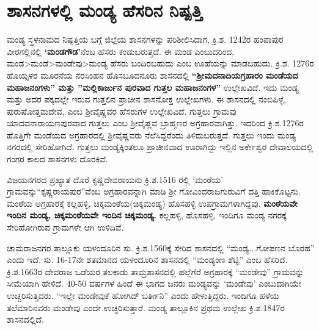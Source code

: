 \section*{ಶಾಸನಗಳಲ್ಲಿ ಮಂಡ್ಯ ಹೆಸರಿನ ನಿಷ್ಪತ್ತಿ}

ಮಂಡ್ಯ ಸ್ಥಳನಾಮದ ನಿಷ್ಪತ್ತಿಯ ಬಗ್ಗೆ ಜಿಲ್ಲೆಯ ಶಾಸನಗಳನ್ನು ಪರಿಶೀಲಿಸಿದಾಗ, ಕ್ರಿ.ಶ. 1242ರ ಹಂಪಾಪುರ ವೀರಗಲ್ಲಿನಲ್ಲಿ \textbf{‘ಮಂಡಗೌಡ’}ನೆಂಬ ಹೆಸರು ಕಂಡುಬರುತ್ತದೆ. ಈ ಮಂಡ ಎಂಬುದರಿಂದ, ಮಂಡ\textgreater ಮಂಡೆ\textgreater ಮಂಡೇವು\textgreater ಮಂಡ್ಯ ಹೆಸರು ಬಂದಿರಬಹುದು ಎಂಬ ಊಹೆಯನ್ನು ಮಾಡಬಹುದು. ಕ್ರಿ.ಶ. 1276ರ ಹೊಯ್ಸಳರ ಮೂರನೆಯ ನರಸಿಂಹನ ಹೊಸಬೂದನೂರು ಶಾಸನದಲ್ಲಿ \textbf{“ಶ‍್ರೀಮದನಾದಿಯಗ್ರಹಾರಂ ಮಂಡೆಯದ ಮಹಾಜನಂಗಳು” ಮತ್ತು ''ಮಲ್ಲಿಕಾರ್ಜುನ ಪುರವಾದ ಗುತ್ತಲ ಮಹಾಜನಂಗಳ”} ಉಲ್ಲೇಖವಿದೆ. ಇದು ಮಂಡ್ಯ ಮತ್ತು ಅದರ ಪಕ್ಕದಲ್ಲೇ ಇರುವ ಗುತ್ತಲಿನ ಪ್ರಾಚೀನ ಶಾಸನೋಕ್ತ ಉಲ್ಲೇಖಗಳು. ಈ ಶಾಸನದಲ್ಲಿ ನಂಬಿಪಿಳ್ಳೆ, ಪುರುಷೋತ್ತಮದೇವ, ಎಂಬ ಶ‍್ರೀವೈಷ್ಣವರ ಹೆಸರುಗಳ ಉಲ್ಲೇಖವಿದೆ. ಗುತ್ತಲು ಗ್ರಾಮವು ಯಾದವನಾರಾಯಣಪುರವಾದ ಗುತ್ತಲು ಎಂಬ ಶ‍್ರೀವೈಷ್ಣವ ಬ್ರಾಹ್ಮಣರ ಅಗ್ರಹಾರವಾಗಿತ್ತು. ಇದರಿಂದ ಕ್ರಿ.ಶ.1276ರ ಹೊತ್ತಿಗೇ ಮಂಡೆಯದ ಅಗ್ರಹಾರದಲ್ಲಿ ಶ‍್ರೀವೈಷ್ಣವರು ನೆಲೆಸಿದ್ದರೆಂದು ತಿಳಿದುಬರುತ್ತದೆ. ಗುತ್ತಲು ಇಂದು ಮಂಡ್ಯ ನಗರದಲ್ಲಿ ಸೇರಿಹೋಗಿದೆ. ಗುತ್ತಲು ಮಂಡ್ಯಕ್ಕಿಂತಲೂ ಪ್ರಾಚೀನವಾದ ಊರಾಗಿದ್ದು ಇಲ್ಲಿನ ಅರ್ಕೇಶ್ವರ ದೇವಾಲಯದಲ್ಲಿ ಗಂಗರ ಕಾಲದ ಶಾಸನಗಳು ದೊರಕಿವೆ.

ವಿಜಯನಗರದ ಪ್ರಖ್ಯಾತ ದೊರೆ ಕೃಷ್ಣದೇವರಾಯನು ಕ್ರಿ.ಶ.1516 ರಲ್ಲಿ ‘ಮಂಠೆಯ’ ಗ್ರಾಮವನ್ನು\break “ಕೃಷ್ಣರಾಯಪುರ”ವೆಂಬ ಅಗ್ರಹಾರವನ್ನಾಗಿ ಮಾಡಿ ಶ‍್ರೀ ಗೋವಿಂದರಾಜಗುರುವಿಗೆ ದತ್ತಿ ಹಾಕಿಕೊಟ್ಟನು. ಮಂಠೆಯ ಅಗ್ರಹಾರಕ್ಕೆ ಕಲ್ಲಹಳ್ಳಿ, ಚಿಕ್ಕಮಂಠೆಯ(ಚಿಕ್ಕಮಂಡ್ಯ) ಹೊಸಹಳ್ಳಿ ಉಪಗ್ರಾಮಗಳಾಗಿದ್ದವು. \textbf{ಮಂಠೆಯವೇ ಇಂದಿನ ಮಂಡ್ಯ, ಚಿಕ್ಕಮಂಠೆಯವೇ ಇಂದಿನ ಚಿಕ್ಕಮಂಡ್ಯ.} ಕಲ್ಲಹಳ್ಳಿ, ಹೊಸಹಳ್ಳಿ, ಇಂದಿಗೂ ಮಂಡ್ಯ ನಗರಕ್ಕೆ ಸೇರಿಹೋಗಿರುವ ಗ್ರಾಮಗಳೇ ಆಗಿ ಉಳಿದಿವೆ.

ಚಾಮರಾಜನಗರ ತಾಲ್ಲೂಕು ಯಳಂದೂರಿನ ಸು. ಕ್ರಿ.ಶ.1560ಕ್ಕೆ ಸೇರಿದ ಶಾಸನದಲ್ಲಿ “ಮಂಡ್ಯ...ಗೋಪಣನ ಬೊರಹ” ಎಂದು ಇದೆ. ಸು. 16-17ನೇ ಶತಮಾನದ ಯಳಂದೂರಿನ ಶಾಸನದಲ್ಲಿ “ಮಂಡ್ಯಂಣ ಶೆಟ್ಟಿ” ಎಂಬ ಹೆಸರಿದೆ. ಕ್ರಿ.ಶ.1663ರ ದೇವರಾಜ ಒಡೆಯರ ತಲಕಾಡು ತಾಮ್ರಶಾಸನದಲ್ಲಿ ಹಲ್ಲೆಗೆರೆ ಅಗ್ರಹಾರಕ್ಕೆ “ಮಂಡೇವು” ಗ್ರಾಮವನ್ನು ಸೀಮೆಯಾಗಿ ಹೇಳಿದೆ. 40-50 ವರ್ಷಗಳ ಹಿಂದೆ ಈ ಭಾಗದ ಜನರು ಮಂಡ್ಯವನ್ನು ‘ಮಂಡೇವು’ ಎಂಬುದಾಗಿಯೇ ಉಚ್ಚರಿಸುತ್ತಿದರು. “ಇಲ್ಲೇ ಮಂಡೇವುಕೆ ಹೋಗಿದ್​ ಬರ್ತೀನಿ” ಎಂದು ಹೇಳುತ್ತಿದ್ದರು. ಇಂದಿಗೂ ಹಳೆಯ ತಲೆಮಾರಿನವರು ಮಂಡೇವು ಎಂದೇ ಉಚ್ಛರಿಸುತ್ತಾರೆ. ಮಂಡ್ಯ ತಾಲ್ಲೂಕಿನ ಪ್ರಥಮ ಉಲ್ಲೇಖ ಕ್ರಿ.ಶ.1847ರ ಶಾಸನದಲ್ಲಿದೆ.


